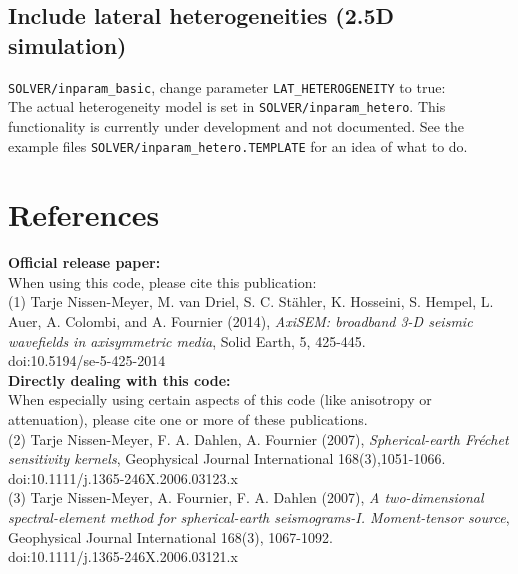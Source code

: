 \documentclass{article}
\begin{document}
\subsection{Include lateral heterogeneities (2.5D simulation)}
\verb|SOLVER/inparam_basic|, change parameter \verb|LAT_HETEROGENEITY| to true:\\
The actual heterogeneity model is set in \verb|SOLVER/inparam_hetero|. 
This functionality is currently under development and not documented. See the example
files \verb|SOLVER/inparam_hetero.TEMPLATE| for an idea of what to do.


\newpage
\section{References}

\noindent \textbf{Official release paper:}\vspace*{0.2cm}\\
When using this code, please cite this publication: \\

(1) Tarje Nissen-Meyer, M. van Driel, S. C. St\"{a}hler, K. Hosseini, S. Hempel, L. Auer, 
A. Colombi, and A. Fournier (2014), \textit{AxiSEM: broadband 3-D seismic wavefields
in axisymmetric media},  Solid Earth, 5, 425-445. \\
doi:10.5194/se-5-425-2014\\

\noindent \textbf{Directly dealing with this code:}\vspace*{0.2cm}\\
When especially using certain aspects of this code (like anisotropy or attenuation), 
please cite one or more of these publications. \\

(2) Tarje Nissen-Meyer, F. A. Dahlen, A. Fournier (2007),
\textit{Spherical-earth Fr\'{e}chet sensitivity kernels},        
Geophysical Journal International 168(3),1051-1066. \\
doi:10.1111/j.1365-246X.2006.03123.x                \\
                                                        
(3) Tarje Nissen-Meyer, A. Fournier, F. A. Dahlen (2007), 
\textit{A two-dimensional spectral-element method for
spherical-earth seismograms-I. Moment-tensor source}, 
Geophysical Journal International 168(3), 1067-1092. \\
doi:10.1111/j.1365-246X.2006.03121.x                 \\
                                                       
\end{document}
